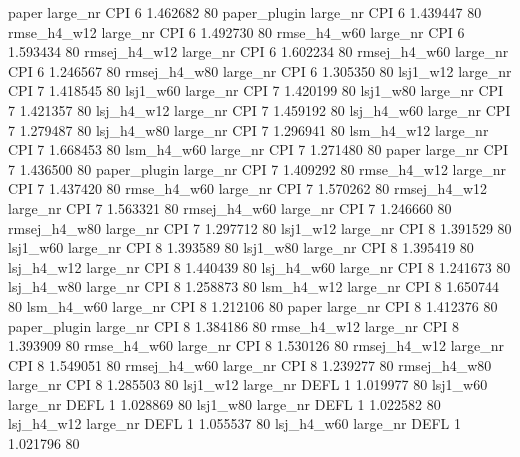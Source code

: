        paper   large_nr      CPI                 6 1.462682 80
paper_plugin   large_nr      CPI                 6 1.439447 80
 rmse_h4_w12   large_nr      CPI                 6 1.492730 80
 rmse_h4_w60   large_nr      CPI                 6 1.593434 80
rmsej_h4_w12   large_nr      CPI                 6 1.602234 80
rmsej_h4_w60   large_nr      CPI                 6 1.246567 80
rmsej_h4_w80   large_nr      CPI                 6 1.305350 80
    lsj1_w12   large_nr      CPI                 7 1.418545 80
    lsj1_w60   large_nr      CPI                 7 1.420199 80
    lsj1_w80   large_nr      CPI                 7 1.421357 80
  lsj_h4_w12   large_nr      CPI                 7 1.459192 80
  lsj_h4_w60   large_nr      CPI                 7 1.279487 80
  lsj_h4_w80   large_nr      CPI                 7 1.296941 80
  lsm_h4_w12   large_nr      CPI                 7 1.668453 80
  lsm_h4_w60   large_nr      CPI                 7 1.271480 80
       paper   large_nr      CPI                 7 1.436500 80
paper_plugin   large_nr      CPI                 7 1.409292 80
 rmse_h4_w12   large_nr      CPI                 7 1.437420 80
 rmse_h4_w60   large_nr      CPI                 7 1.570262 80
rmsej_h4_w12   large_nr      CPI                 7 1.563321 80
rmsej_h4_w60   large_nr      CPI                 7 1.246660 80
rmsej_h4_w80   large_nr      CPI                 7 1.297712 80
    lsj1_w12   large_nr      CPI                 8 1.391529 80
    lsj1_w60   large_nr      CPI                 8 1.393589 80
    lsj1_w80   large_nr      CPI                 8 1.395419 80
  lsj_h4_w12   large_nr      CPI                 8 1.440439 80
  lsj_h4_w60   large_nr      CPI                 8 1.241673 80
  lsj_h4_w80   large_nr      CPI                 8 1.258873 80
  lsm_h4_w12   large_nr      CPI                 8 1.650744 80
  lsm_h4_w60   large_nr      CPI                 8 1.212106 80
       paper   large_nr      CPI                 8 1.412376 80
paper_plugin   large_nr      CPI                 8 1.384186 80
 rmse_h4_w12   large_nr      CPI                 8 1.393909 80
 rmse_h4_w60   large_nr      CPI                 8 1.530126 80
rmsej_h4_w12   large_nr      CPI                 8 1.549051 80
rmsej_h4_w60   large_nr      CPI                 8 1.239277 80
rmsej_h4_w80   large_nr      CPI                 8 1.285503 80
    lsj1_w12   large_nr     DEFL                 1 1.019977 80
    lsj1_w60   large_nr     DEFL                 1 1.028869 80
    lsj1_w80   large_nr     DEFL                 1 1.022582 80
  lsj_h4_w12   large_nr     DEFL                 1 1.055537 80
  lsj_h4_w60   large_nr     DEFL                 1 1.021796 80
